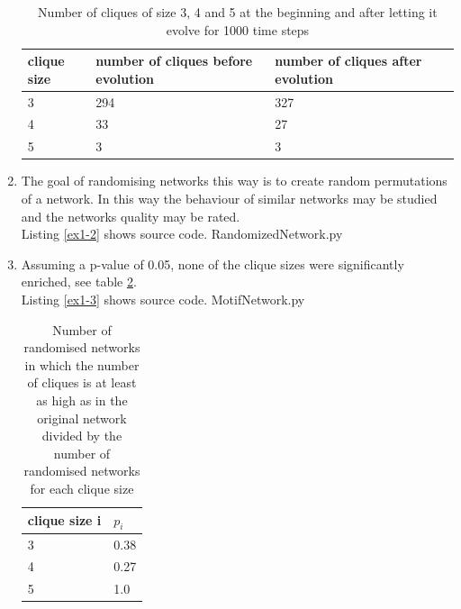 \documentclass[10pt,a4paper]{article}
\begin{document}
\begin{enumerate}
\begin{table}[!h]
\label{tab2}
\begin{tabular}{llll}
clique size & number of cliques before evolution & number of cliques after evolution\\
\hline
3 & 294 & 327\\
4 & 33 & 27\\
5 & 3 & 3\\
\end{tabular}
\caption{Number of cliques of size 3, 4 and 5 at the beginning and after letting it evolve for 1000 time steps}
\end{table}

\item The goal of randomising networks this way is to create random permutations of a network. In this way the behaviour of similar networks may be studied and the networks quality may be rated.\\
Listing \ref{ex1-2} shows source code.
 {RandomizedNetwork.py}

\item Assuming a p-value of 0.05, none of the clique sizes were significantly enriched, see table \ref{tab3}.\\
Listing \ref{ex1-3} shows source code.
 {MotifNetwork.py}
\begin{table}[!h]
\label{tab3}
\begin{tabular}{ll}
clique size i & $p_i$\\
\hline
3 & 0.38\\
4 & 0.27\\
5 & 1.0\\
\end{tabular}
\caption{Number of randomised networks in which the
number of cliques is at least as high as in the original network divided by the number of randomised networks for each clique size}
\end{table}
\end{enumerate}
\end{document}

